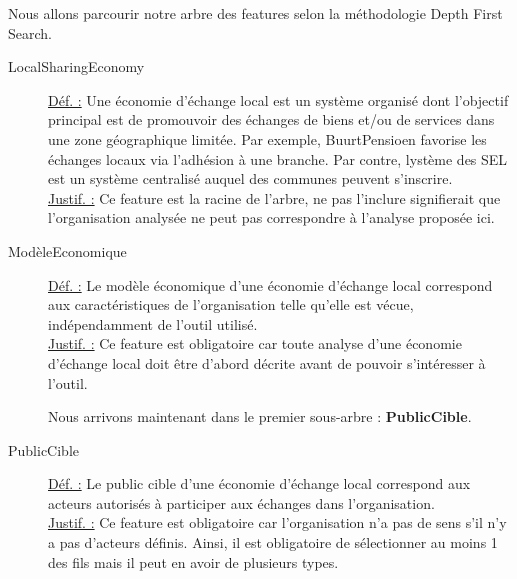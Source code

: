 Nous allons parcourir notre arbre des features selon la méthodologie Depth First Search.

\begin{description}

\item [LocalSharingEconomy]
\underline{Déf. :}  Une économie d'échange local est un système organisé dont l'objectif principal est de promouvoir des échanges de biens et/ou de services dans une zone géographique limitée.  Par exemple,  BuurtPensioen favorise les échanges locaux via l'adhésion à une branche.  Par contre,  lystème des SEL est un système centralisé auquel des communes peuvent s'inscrire.   
\\ \underline{Justif. :}  Ce feature est la racine de l'arbre,  ne pas l'inclure signifierait que l'organisation analysée ne peut pas correspondre à l'analyse proposée ici.
\newline

\item [ModèleEconomique]
\underline{Déf. :}  Le modèle économique d'une économie d'échange local correspond aux caractéristiques de l'organisation telle qu'elle est vécue,  indépendamment de l'outil utilisé.
\\ \underline{Justif. :}  Ce feature est obligatoire car toute analyse d'une économie d'échange local doit être d'abord décrite avant de pouvoir s'intéresser à l'outil.
\newline

Nous arrivons maintenant dans le premier sous-arbre : \textbf{PublicCible}.
\newline
\begin{center}
\end{center}

\item [PublicCible]
\underline{Déf. :}  Le public cible d'une économie d'échange local correspond aux acteurs autorisés à participer aux échanges dans l'organisation.
\\ \underline{Justif. :}  Ce feature est obligatoire car l'organisation n'a pas de sens s'il n'y a pas d'acteurs définis.  Ainsi,  il est obligatoire de sélectionner au moins 1 des fils mais il peut en avoir de plusieurs types.  
\newline


\end{description}
